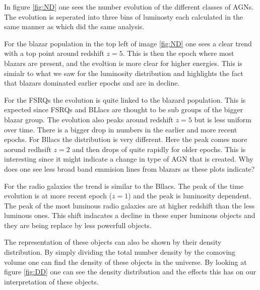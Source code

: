 \documentclass{article}
\begin{document}
In figure \ref{fig:ND} one sees the number evolution of the different classes of AGNs. The evolution is seperated into three bins of luminosty each calculated in the same manner as \cite{Jacobsen:2015mga} which did the same analysis.

For the blazar population in the top left of image \ref{fig:ND} one sees a clear trend with a top point around redshift $z=5$. 
This is then the epoch where most blazars are present, and the evoltion is more clear for higher energies. This is simialr to what we saw for the luminosity distribution and highlights the fact that blazars dominated earlier epochs and are in decline. 


For the FSRQs the evolution is quite linked to the blazard population. This is expected since FSRQs and BLlacs are thought to be 
sub groups of the bigger blazar group. The evolution also peaks around redshift $z=5$ but is less uniform over time. There is a bigger drop 
in numbers in the earlier and more recent epochs. For Bllacs the distribution is very different. Here the peak comes more aorund redhsift $z=2$ and then drops of quite rapidly for older epochs.
This is interesting since it might indicate a change in type of AGN that is created. Why does one see less broad band emmision lines from blazars as these plots indicate? 

For the radio galaxies the trend is similar to the Bllacs. The peak of the time evolution is at more recent epoch ($z=1$) and the peak is 
luminosity dependent. The peak of the most luminous radio galaxies are at higher redshift than the less luminous ones. This shift indacates a decline in these super luminous objects and they are being replace by less powerfull objects. 


The representation of these objects can also be shown by their density distribution. By simply dividing the total number density by the comoving volume one can
find the density of these objects in the universe. By looking at figure \ref{fig:DD} one can see the density distribution and the effects this has on our interpretation of these objects.
\end{document}
